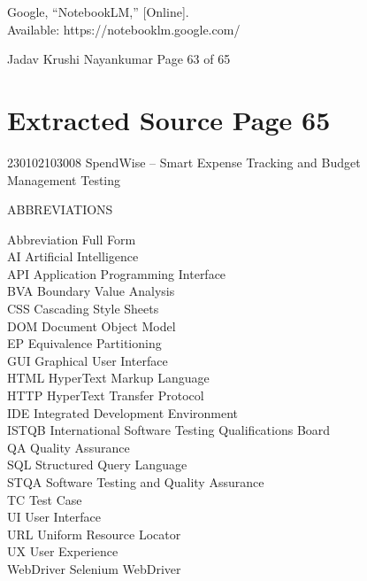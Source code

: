 \documentclass[12pt,a4paper]{report}
\begin{document}
\smallskip
[8] Google, “NotebookLM,” [Online].\\ 
Available: https://notebooklm.google.com/\\ 

\smallskip

\smallskip

\smallskip

\smallskip
Jadav Krushi Nayankumar                                                   Page 63 of 65\\ 

\clearpage
\section*{Extracted Source Page 65}
230102103008                   SpendWise – Smart Expense Tracking and Budget\\ 
Management Testing\\ 

\smallskip

\smallskip

\smallskip
ABBREVIATIONS\\ 

\smallskip

\smallskip
Abbreviation       Full Form\\ 

\smallskip
AI                 Artificial Intelligence\\ 
API                Application Programming Interface\\ 
BVA                Boundary Value Analysis\\ 
CSS                Cascading Style Sheets\\ 
DOM                Document Object Model\\ 
EP                 Equivalence Partitioning\\ 
GUI                Graphical User Interface\\ 
HTML               HyperText Markup Language\\ 
HTTP               HyperText Transfer Protocol\\ 
IDE                Integrated Development Environment\\ 
ISTQB              International Software Testing Qualifications Board\\ 
QA                 Quality Assurance\\ 
SQL                Structured Query Language\\ 
STQA               Software Testing and Quality Assurance\\ 
TC                 Test Case\\ 
UI                 User Interface\\ 
URL                Uniform Resource Locator\\ 
UX                 User Experience\\ 
WebDriver          Selenium WebDriver\\ 
\end{document}
